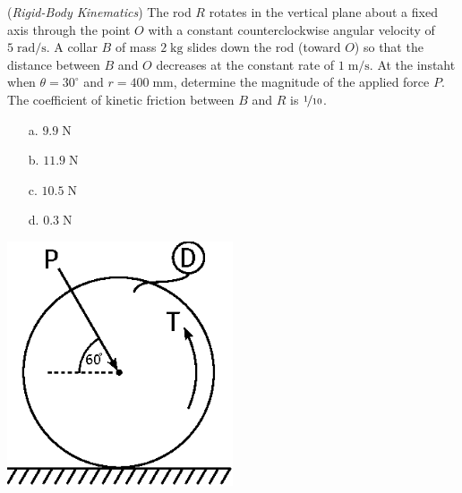 \documentclass[addpoints, 12pt]{exam}
\begin{document}
\begin{questions}
\begin{minipage}{0.5\textwidth}
\question(\textit{Rigid-Body Kinematics})
The rod $R$ rotates in the vertical plane about a fixed axis through the point 
$O$ with a constant counterclockwise angular velocity of $5 \;
\unit{\radian\per\second}$. A collar $B$ of mass $2 \; \unit{\kilo\gram}$ slides
down the rod (toward $O$) so that the distance between $B$ and $O$ decreases at
the constant rate of $1 \; \unit{\meter\per\second}$. At the instaht when
$\theta = 30^\circ$ and $r = 400 \; \unit{\milli\meter}$, determine the 
magnitude of the applied force $P$. The coefficient of kinetic friction between 
$B$ and $R$ is $\nicefrac{1}{10}$. \\[0.5ex]

\begin{minipage}{0.45\textwidth}
    \begin{center}
    \begin{itemize}
        \setlength\itemsep{-0.4em}
        \item[a.] $9.9 \; \unit{\newton}$
        \item[b.] $11.9 \; \unit{\newton}$
    \end{itemize}
    \end{center}
\end{minipage}
\begin{minipage}{0.45\textwidth}
    \begin{center}
    \begin{itemize}
        \setlength\itemsep{-0.4em}
        \item[c.] $10.5 \; \unit{\newton}$
        \item[d.] $0.3 \; \unit{\newton}$
    \end{itemize}
    \end{center}
\end{minipage}

\end{minipage}
%
\begin{minipage}{0.5\textwidth}
    \centering
    \includegraphics[width=0.5\textwidth,valign=c]{./figures/question6.eps}
\end{minipage}




\end{questions}
\end{document}
